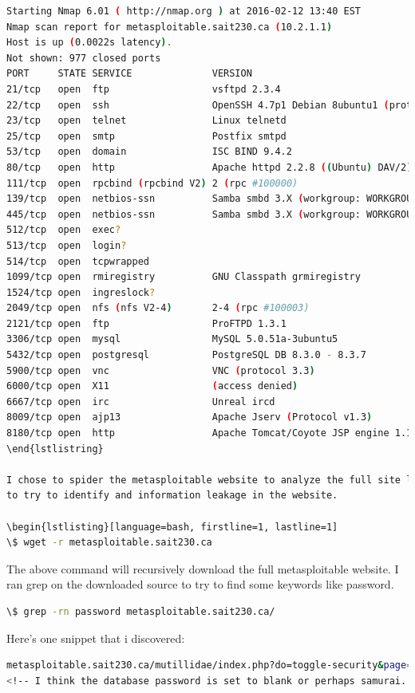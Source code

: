 \documentclass{article}
\begin{document}
\begin{lstlisting}[language=bash]
Starting Nmap 6.01 ( http://nmap.org ) at 2016-02-12 13:40 EST
Nmap scan report for metasploitable.sait230.ca (10.2.1.1)
Host is up (0.0022s latency).
Not shown: 977 closed ports
PORT     STATE SERVICE              VERSION
21/tcp   open  ftp                  vsftpd 2.3.4
22/tcp   open  ssh                  OpenSSH 4.7p1 Debian 8ubuntu1 (protocol 2.0)
23/tcp   open  telnet               Linux telnetd
25/tcp   open  smtp                 Postfix smtpd
53/tcp   open  domain               ISC BIND 9.4.2
80/tcp   open  http                 Apache httpd 2.2.8 ((Ubuntu) DAV/2)
111/tcp  open  rpcbind (rpcbind V2) 2 (rpc #100000)
139/tcp  open  netbios-ssn          Samba smbd 3.X (workgroup: WORKGROUP)
445/tcp  open  netbios-ssn          Samba smbd 3.X (workgroup: WORKGROUP)
512/tcp  open  exec?
513/tcp  open  login?
514/tcp  open  tcpwrapped
1099/tcp open  rmiregistry          GNU Classpath grmiregistry
1524/tcp open  ingreslock?
2049/tcp open  nfs (nfs V2-4)       2-4 (rpc #100003)
2121/tcp open  ftp                  ProFTPD 1.3.1
3306/tcp open  mysql                MySQL 5.0.51a-3ubuntu5
5432/tcp open  postgresql           PostgreSQL DB 8.3.0 - 8.3.7
5900/tcp open  vnc                  VNC (protocol 3.3)
6000/tcp open  X11                  (access denied)
6667/tcp open  irc                  Unreal ircd
8009/tcp open  ajp13                Apache Jserv (Protocol v1.3)
8180/tcp open  http                 Apache Tomcat/Coyote JSP engine 1.1
\end{lstlistring}

I chose to spider the metasploitable website to analyze the full site locally 
to try to identify and information leakage in the website.

\begin{lstlisting}[language=bash, firstline=1, lastline=1]
\$ wget -r metasploitable.sait230.ca
\end{lstlisting}

The above command will recursively download the full metasploitable website. I ran grep
on the downloaded source to try to find some keywords like password.

\begin{lstlisting}[language=bash]
\$ grep -rn password metasploitable.sait230.ca/
\end{lstlisting}

Here's one snippet that i discovered:

\begin{lstlisting}[language=bash]
metasploitable.sait230.ca/mutillidae/index.php?do=toggle-security&page=user-info.php:2: \
<!-- I think the database password is set to blank or perhaps samurai.
\end{lstlisting}
\end{document}
